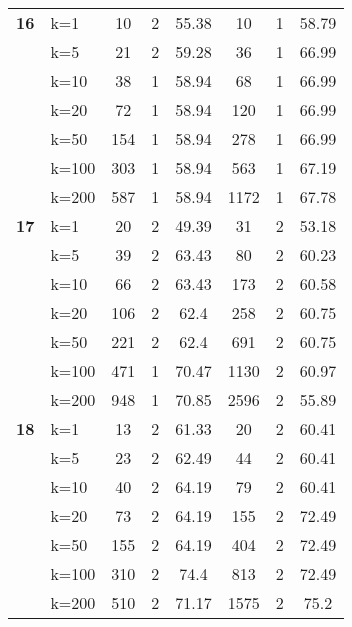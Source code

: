 \begin{table}[htbp]
\begin{tabular}{ll|ccc|ccc}
    \multicolumn{1}{r}{\textbf{16}} & k=1 & 10 & 2 & 55.38 & 10 & 1 & 58.79 \\ 
     & k=5 & 21 & 2 & 59.28 & 36 & 1 & 66.99 \\ 
     & k=10 & 38 & 1 & 58.94 & 68 & 1 & 66.99 \\ 
     & k=20 & 72 & 1 & 58.94 & 120 & 1 & 66.99 \\ 
     & k=50 & 154 & 1 & 58.94 & 278 & 1 & 66.99 \\ 
     & k=100 & 303 & 1 & 58.94 & 563 & 1 & 67.19 \\ 
     & k=200 & 587 & 1 & 58.94 & 1172 & 1 & 67.78 \\ \hline
    \multicolumn{1}{r}{\textbf{17}} & k=1 & 20 & 2 & 49.39 & 31 & 2 & 53.18 \\ 
     & k=5 & 39 & 2 & 63.43 & 80 & 2 & 60.23 \\ 
     & k=10 & 66 & 2 & 63.43 & 173 & 2 & 60.58 \\ 
     & k=20 & 106 & 2 & 62.4 & 258 & 2 & 60.75 \\ 
     & k=50 & 221 & 2 & 62.4 & 691 & 2 & 60.75 \\ 
     & k=100 & 471 & 1 & 70.47 & 1130 & 2 & 60.97 \\ 
     & k=200 & 948 & 1 & 70.85 & 2596 & 2 & 55.89 \\ \hline
    \multicolumn{1}{r}{\textbf{18}} & k=1 & 13 & 2 & 61.33 & 20 & 2 & 60.41 \\ 
     & k=5 & 23 & 2 & 62.49 & 44 & 2 & 60.41 \\ 
     & k=10 & 40 & 2 & 64.19 & 79 & 2 & 60.41 \\ 
     & k=20 & 73 & 2 & 64.19 & 155 & 2 & 72.49 \\ 
     & k=50 & 155 & 2 & 64.19 & 404 & 2 & 72.49 \\ 
     & k=100 & 310 & 2 & 74.4 & 813 & 2 & 72.49 \\ 
     & k=200 & 510 & 2 & 71.17 & 1575 & 2 & 75.2 \\ \hline
    \end{tabular}
    \label{use_case_3}
    \end{table}
    